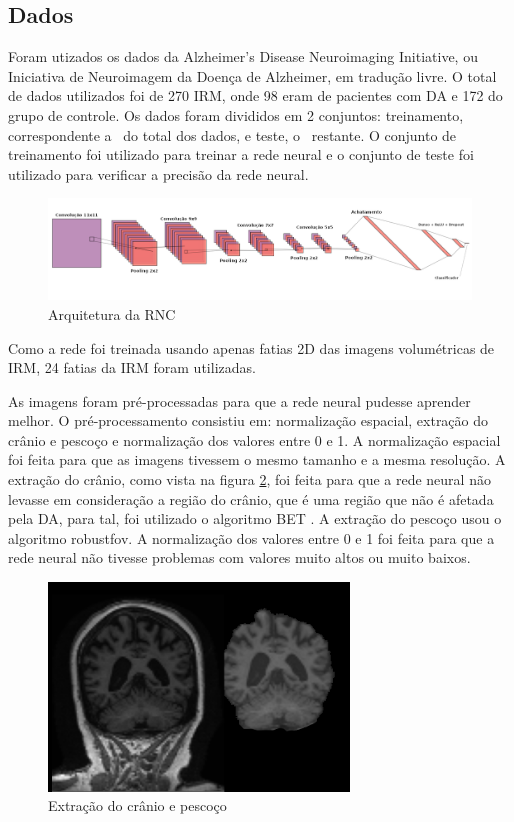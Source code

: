 \documentclass[conference]{IEEEtran}
\begin{document}
\subsection{Dados}

Foram utizados os dados da Alzheimer's Disease Neuroimaging Initiative, ou Iniciativa de Neuroimagem da Doença de Alzheimer, em tradução livre. O total de dados utilizados foi de 270 IRM, onde 98 eram de pacientes com DA e 172 do grupo de controle. Os dados foram divididos em 2 conjuntos: treinamento, correspondente a \textthreequarters ~do total dos dados, e teste, o \textonequarter~restante. O conjunto de treinamento foi utilizado para treinar a rede neural e o conjunto de teste foi utilizado para verificar a precisão da rede neural.

\begin{figure}[ht!]
\centering
\includegraphics[width=18cm]{img/architecture.png}
\caption{Arquitetura da RNC}
\label{fig:arch}
\end{figure}

Como a rede foi treinada usando apenas fatias 2D das imagens volumétricas de IRM, 24 fatias da IRM foram utilizadas.

As imagens foram pré-processadas para que a rede neural pudesse aprender melhor. O pré-processamento consistiu em: normalização espacial, extração do crânio e pescoço e normalização dos valores entre 0 e 1. A normalização espacial foi feita para que as imagens tivessem o mesmo tamanho e a mesma resolução. A extração do crânio, como vista na figura \ref{fig:bet}, foi feita para que a rede neural não levasse em consideração a região do crânio, que é uma região que não é afetada pela DA, para tal, foi utilizado o algoritmo BET \cite{bet}. A extração do pescoço usou o algoritmo robustfov. A normalização dos valores entre 0 e 1 foi feita para que a rede neural não tivesse problemas com valores muito altos ou muito baixos.

\begin{figure}[H]
\centering
\includegraphics[width=8cm]{img/bet.png}
\caption{Extração do crânio e pescoço}
\label{fig:bet}
\end{figure}
\end{document}
